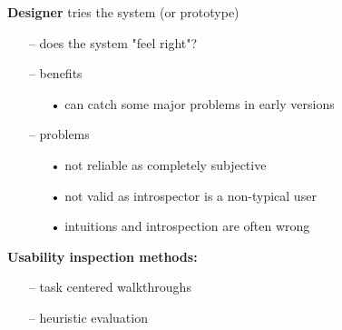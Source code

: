 \documentclass[pdf]{beamer}
\begin{document}
{{\begin{frame}
    \textbf{Designer} tries the system (or prototype)\par
    \begin{itemize}
    \item[\textcolor{black}{--}] does the system "feel right"?
    \item[\textcolor{black}{--}] benefits
    	\begin{itemize}
    	\item[\textcolor{black}{•}] can catch some major problems in early versions
    	\end{itemize}
    \item[\textcolor{black}{--}] problems
    \begin{itemize}
    	\item[\textcolor{black}{•}] not reliable as completely subjective
        \item[\textcolor{black}{•}] not valid as introspector is a non-typical user
        \item[\textcolor{black}{•}] intuitions and introspection are often wrong
    \end{itemize}
    \end{itemize}
    \textbf{Usability inspection methods:}\par
    \begin{itemize}
    	\item[\textcolor{black}{--}] task centered walkthroughs
    	\item[\textcolor{black}{--}] heuristic evaluation
    \end{itemize}
\end{frame}}



}
\end{document}
